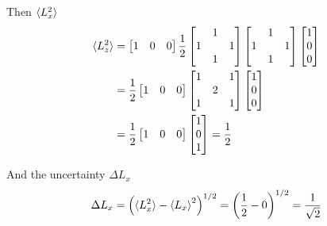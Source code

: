 \documentclass[../../../main.tex]{subfiles}
\begin{document}
Then $\braket{L_x^2}$
\begin{align*}
    \braket{L_z^2} & =
    \begin{bmatrix}
        1 & 0 & 0
    \end{bmatrix}
    \frac{1 }{2}
    \begin{bmatrix}
          & 1 &   \\
        1 &   & 1 \\
          & 1 &   \\
    \end{bmatrix}
    \begin{bmatrix}
          & 1 &   \\
        1 &   & 1 \\
          & 1 &   \\
    \end{bmatrix}
    \begin{bmatrix}
        1 \\
        0 \\
        0 \\
    \end{bmatrix}     \\
                   & =
    \frac{1 }{2}
    \begin{bmatrix}
        1 & 0 & 0
    \end{bmatrix}
    \begin{bmatrix}
        1 &   & 1 \\
          & 2 &   \\
        1 &   & 1 \\
    \end{bmatrix}
    \begin{bmatrix}
        1 \\
        0 \\
        0 \\
    \end{bmatrix}     \\
                   & =
    \frac{1 }{2}
    \begin{bmatrix}
        1 & 0 & 0
    \end{bmatrix}
    \begin{bmatrix}
        1 \\
        0 \\
        1 \\
    \end{bmatrix}
    =
    \frac{1 }{2 }
\end{align*}

And the uncertainty $\Delta L_x$
\begin{equation*}
    \Delta L_x =  \left( \braket{L_x^2}-\braket{L_x}^2 \right) ^{1/2 }=\left( \frac{1 }{2 } -0\right) ^{1/2 }=\frac{1 }{\sqrt{2 }}
\end{equation*}
\end{document}
